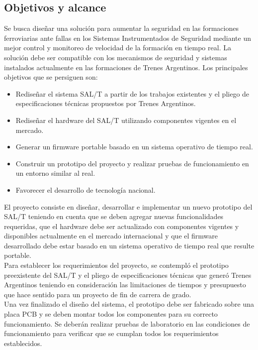 \subsection{Objetivos y alcance}

Se busca diseñar una solución para aumentar la seguridad en las formaciones ferroviarias ante fallas en los Sistemas Instrumentados de Seguridad mediante un mejor control y monitoreo de velocidad de la formación en tiempo real. La solución debe ser compatible con los mecanismos de seguridad y sistemas instalados actualmente en las formaciones de Trenes Argentinos. Los principales objetivos que se persiguen son:


\begin{itemize}
    \item Rediseñar el sistema SAL/T a partir de los trabajos existentes y el pliego de especificaciones técnicas propuestos por Trenes Argentinos.
    \item Rediseñar el hardware del SAL/T utilizando componentes vigentes en el mercado.
    \item Generar un firmware portable basado en un sistema operativo de tiempo real.
    \item Construir un prototipo del proyecto y realizar pruebas de funcionamiento en un entorno similar al real.
    \item Favorecer el desarrollo de tecnología nacional.
\end{itemize}


El proyecto consiste en diseñar, desarrollar e implementar un nuevo prototipo del SAL/T teniendo en cuenta que se deben agregar nuevas funcionalidades requeridas, que el hardware debe ser actualizado con componentes vigentes y disponibles actualmente en el mercado internacional y que el firmware desarrollado debe estar basado en un sistema operativo de tiempo real que resulte portable. \\

Para establecer los requerimientos del proyecto, se contempló el prototipo preexistente del SAL/T y el pliego de especificaciones técnicas que generó Trenes Argentinos teniendo en consideración las limitaciones de tiempos y presupuesto que hace sentido para un proyecto de fin de carrera de grado. \\

Una vez finalizado el diseño del sistema, el prototipo debe ser fabricado sobre una placa PCB y se deben montar todos los componentes para su correcto funcionamiento. Se deberán realizar pruebas de laboratorio en las condiciones de funcionamiento para verificar que se cumplan todos los requerimientos establecidos. 